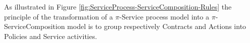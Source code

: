 


%

As illustrated in Figure \ref{fig:ServiceProcess-ServiceComposition-Rules} the  principle of the transformation  of a  $\pi$-Service process model into a   $\pi$-ServiceComposition model is to group respectively  {\sf Contracts}  and {\sf Actions} into {\sf Policies} and {\sf Service activities}.   

